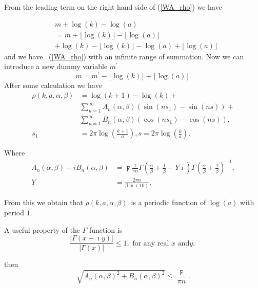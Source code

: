 \documentclass[titlepage,fleqn]{article}%
\begin{document}
From the leading term on the right hand side of (\ref{WA_rho}) we have%

\begin{align*}
&  m+\log(k)-\log(a)\\
&  =m+\lfloor\log(k)\rfloor-\lfloor\log(a)\rfloor\\
&  +\log(k)-\lfloor\log(k)\rfloor-\log(a)+\lfloor\log(a)\rfloor
\end{align*}
and we have \ (\ref{WA_rho}) with an infinite range of summation. Now we can
introduce a new dummy variable $m^{\prime}$
\[
m=m^{\prime}-\lfloor\log(k)\rfloor+\lfloor\log(a)\rfloor.
\]
After some calculation we have%
\begin{align*}
\rho(k,a,\alpha,\beta)  &  =\log(k+1)-\log(k)+\\
&
{\displaystyle\sum\limits_{n=1}^{\infty}}
A_{n}(\alpha,\beta)\left(  \sin\left(  ns_{1}\right)  -\sin\left(  ns\right)
\right)  +\\
&
{\displaystyle\sum\limits_{n=1}^{\infty}}
B_{n}(\alpha,\beta)\left(  \cos\left(  ns_{1}\right)  -\cos\left(  ns\right)
\right)  ,\\
s_{1}  &  =2\pi\log\left(  \frac{k+1}{a}\right)  ,s=2\pi\log\left(  \frac
{k}{a}\right)  .
\end{align*}
\bigskip

Where%
\begin{align}
A_{n}(\alpha,\beta)+iB_{n}(\alpha,\beta)  &  =\digamma\frac{1}{\pi n}%
\Gamma\left(  \frac{\alpha}{\beta}+\frac{1}{\beta}-Y\imath\right)
\Gamma\left(  \frac{\alpha}{\beta}+\frac{1}{\beta}\right)  ^{-1},\\
Y  &  =\frac{2\pi n}{\beta\ln(10)},
\end{align}


From this we obtain that $\rho(k,a,\alpha,\beta)$\ is a periodic function of
$\log\left(  a\right)  $ with period $1$.

A useful property of the $\Gamma$ function is%
\begin{equation}
\frac{\left\vert \Gamma\left(  x+\imath y\right)  \right\vert }{\left\vert
\Gamma\left(  x\right)  \right\vert }\leq1,\text{ for any real }x\text{ and
}y\text{. } \label{Gamma1}%
\end{equation}


\noindent then%
\begin{equation}
\sqrt{A_{n}(\alpha,\beta)^{2}+B_{n}(\alpha,\beta)^{2}}\leq\frac{\digamma}{\pi
n}. \label{AB1}%
\end{equation}
\end{document}
